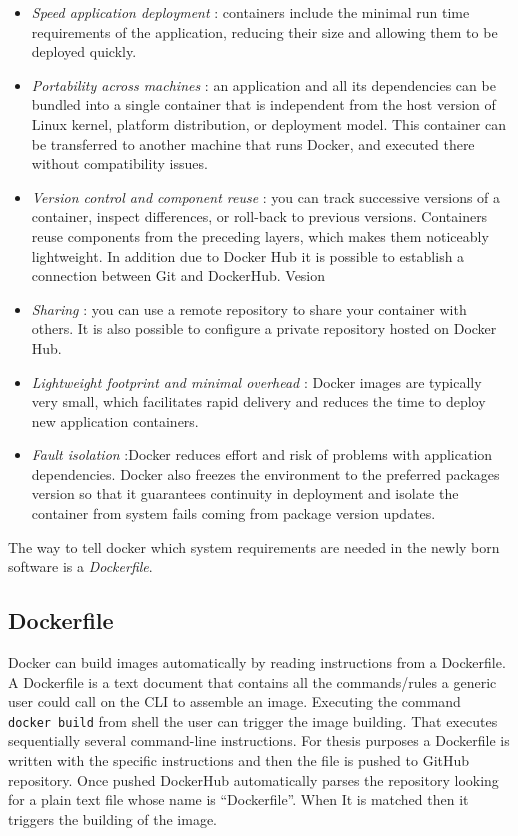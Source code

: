\documentclass[
  12pt,
  a4paper,
  oneside]{book}
\providecommand{\tightlist}{%
  \setlength{\itemsep}{0pt}\setlength{\parskip}{0pt}}
\theoremstyle{definition}
\theoremstyle{definition}
\theoremstyle{definition}
\theoremstyle{remark}
\begin{document}
\begin{itemize}
\tightlist
\item
  \emph{Speed application deployment} : containers include the minimal run time requirements of the application, reducing their size and allowing them to be deployed quickly.
\item
  \emph{Portability across machines} : an application and all its dependencies can be bundled into a single container that is independent from the host version of Linux kernel, platform distribution, or deployment model. This container can be transferred to another machine that runs Docker, and executed there without compatibility issues.
\item
  \emph{Version control and component reuse} : you can track successive versions of a container, inspect differences, or roll-back to previous versions. Containers reuse components from the preceding layers, which makes them noticeably lightweight. In addition due to Docker Hub it is possible to establish a connection between Git and DockerHub. Vesion
\item
  \emph{Sharing} : you can use a remote repository to share your container with others. It is also possible to configure a private repository hosted on Docker Hub.
\item
  \emph{Lightweight footprint and minimal overhead} : Docker images are typically very small, which facilitates rapid delivery and reduces the time to deploy new application containers.
\item
  \emph{Fault isolation} :Docker reduces effort and risk of problems with application dependencies. Docker also freezes the environment to the preferred packages version so that it guarantees continuity in deployment and isolate the container from system fails coming from package version updates.
\end{itemize}

The way to tell docker which system requirements are needed in the newly born software is a \emph{Dockerfile}.

\hypertarget{dockerfile}{%
\subsection{Dockerfile}\label{dockerfile}}

Docker can build images automatically by reading instructions from a Dockerfile. A Dockerfile is a text document that contains all the commands/rules a generic user could call on the CLI to assemble an image. Executing the command \texttt{docker\ build} from shell the user can trigger the image building. That executes sequentially several command-line instructions. For thesis purposes a Dockerfile is written with the specific instructions and then the file is pushed to GitHub repository. Once pushed DockerHub automatically parses the repository looking for a plain text file whose name is ``Dockerfile''. When It is matched then it triggers the building of the image.
\end{document}
